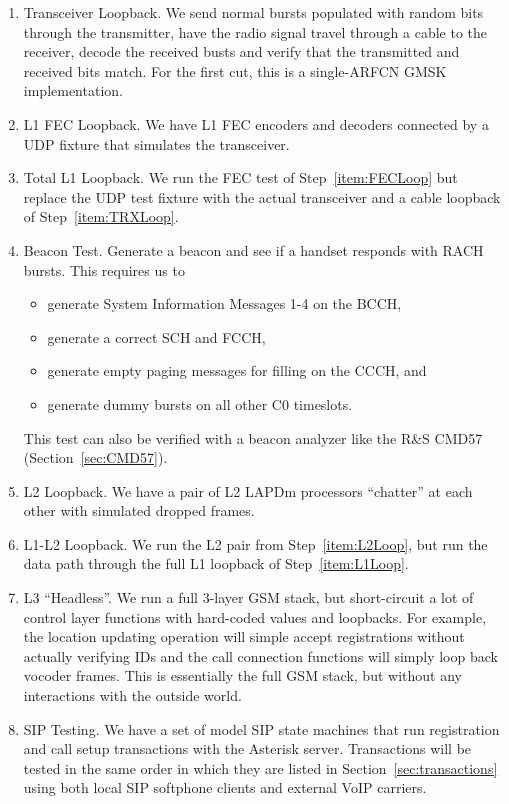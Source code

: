 \documentclass[11pt]{book}
\begin{document}
\begin{enumerate}
	\item \label{item:TRXLoop} Transceiver Loopback.  We send normal bursts populated with random bits through the transmitter, have the radio signal travel through a cable to the receiver, decode the received busts and verify that the transmitted and received bits match.  For the first cut, this is a single-ARFCN GMSK implementation.
	\item \label{item:FECLoop} L1 FEC Loopback. We have L1 FEC encoders and decoders connected by a UDP fixture that simulates the transceiver.
	\item \label{item:L1Loop} Total L1 Loopback. We run the FEC test of Step~\ref{item:FECLoop} but replace the UDP test fixture with the actual transceiver and a cable loopback of Step~\ref{item:TRXLoop}.
	\item Beacon Test.  Generate a beacon and see if a handset responds with RACH bursts. This requires us to
		\begin{itemize}
			\item generate System Information Messages 1-4 on the BCCH,
			\item generate a correct SCH and FCCH, 
			\item generate empty paging messages for filling on the CCCH, and
			\item generate dummy bursts on all other C0 timeslots.
		\end{itemize}
		This test can also be verified with a beacon analyzer like the R\&S CMD57 (Section~\ref{sec:CMD57}).
	\item \label{item:L2Loop} L2 Loopback.  We have a pair of L2 LAPDm processors ``chatter'' at each other with simulated dropped frames.
	\item L1-L2 Loopback. We run the L2 pair from Step~\ref{item:L2Loop}, but run the data path through the full L1 loopback of Step~\ref{item:L1Loop}.
	\item \label{item:headless} L3 ``Headless''. We run a full 3-layer GSM stack, but short-circuit a lot of control layer functions with hard-coded values and loopbacks.  For example, the location updating operation will simple accept registrations without actually verifying IDs and the call connection functions will simply loop back vocoder frames.  This is essentially the full GSM stack, but without any interactions with the outside world.
	\item \label{item:SIPTest} SIP Testing.  We have a set of model SIP state machines that run registration and call setup transactions with the Asterisk server.  Transactions will be tested in the same order in which they are listed in Section~\ref{sec:transactions} using both local SIP softphone clients and external VoIP carriers.

\end{enumerate}
\end{document}
